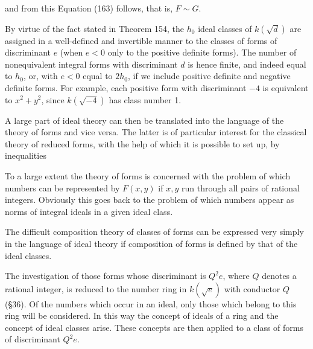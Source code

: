 and from this Equation (163) follows, that is, $F \sim G.$

By virtue of the fact stated in Theorem 154, the $h_0$ ideal classes of $k(\sqrt{d})$ are assigned in a well-defined and invertible manner to the classes of forms of discriminant $e$ (when $e < 0$ only to the positive definite forms). The number of nonequivalent integral forms with discriminant $d$ is hence finite, and indeed equal to $h_0$, or, with $e < 0$ equal to $2h_0$, if we include positive definite and negative definite forms. For example, each positive form with discriminant $-4$ is equivalent to $x^2 + y^2$, since $k(\sqrt{-4})$ has class number 1.

A large part of ideal theory can then be translated into the language of the theory of forms and vice versa. The latter is of particular interest for the classical theory of reduced forms, with the help of which it is possible to set up, by inequalities

To a large extent the theory of forms is concerned with the problem of which numbers can be represented by $F(x, y)$ if $x, y$ run through all pairs of rational integers. Obviously this goes back to the problem of which numbers appear as norms of integral ideals in a given ideal class.

The difficult composition theory of classes of forms can be expressed very simply in the language of ideal theory if composition of forms is defined by that of the ideal classes.

The investigation of those forms whose discriminant is $Q^2 e$, where $Q$ denotes a rational integer, is reduced to the number ring in $k(\sqrt{e})$ with conductor $Q$ (§36). Of the numbers which occur in an ideal, only those which belong to this ring will be considered. In this way the concept of ideals of a ring and the concept of ideal classes arise. These concepts are then applied to a class of forms of discriminant $Q^2 e$.

